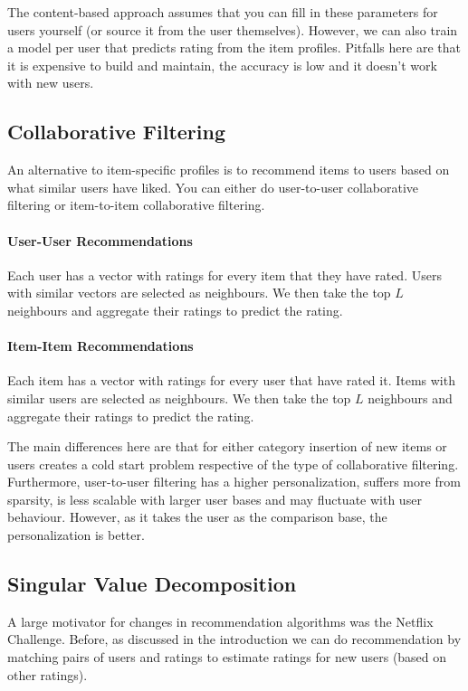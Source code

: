 The content-based approach assumes that you can fill in these parameters
for users yourself (or source it from the user themselves). However, we
can also train a model per user that predicts rating from the item profiles.
Pitfalls here are that it is expensive to build and maintain, the accuracy
is low and it doesn't work with new users.

\subsection{Collaborative Filtering}

An alternative to item-specific profiles is to recommend items to users based
on what similar users have liked. You can either do user-to-user collaborative
filtering or item-to-item collaborative filtering.

\paragraph{User-User Recommendations}

Each user has a vector with ratings for every item that they have rated. Users
with similar vectors are selected as neighbours. We then take the top
$L$ neighbours
and aggregate their ratings to predict the rating.

\paragraph{Item-Item Recommendations}

Each item has a vector with ratings for every user that have rated it. Items
with similar users are selected as neighbours. We then take the top
$L$ neighbours
and aggregate their ratings to predict the rating.

The main differences here are that for either category insertion of new items
or users creates a cold start problem respective of the type of collaborative
filtering. Furthermore, user-to-user filtering has a higher personalization,
suffers more from sparsity, is less scalable with larger user bases and may
fluctuate with user behaviour. However, as it takes the user as the comparison
base, the personalization is better.

\subsection{Singular Value Decomposition}

A large motivator for changes in recommendation algorithms
was the Netflix Challenge. Before, as discussed in the introduction
we can do recommendation by matching pairs of users and ratings to
estimate ratings for new users (based on other ratings).

